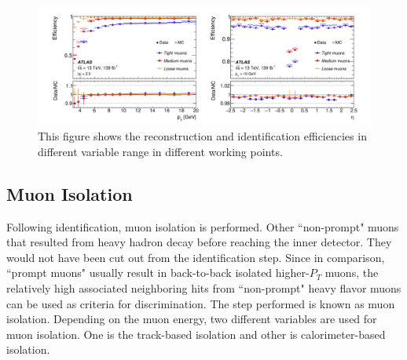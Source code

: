 \begin{figure}[!htb]
    \begin{center}
        \includegraphics[width=1\textwidth]{figures/common_ana/IdentificationEff}
        \caption{
            This figure shows the reconstruction and identification efficiencies in different variable range in different working points\cite{Aad:2746302}.
        }
        \label{fig:identificationWP}
    \end{center}
\end{figure}



\subsection{Muon Isolation}
Following identification, muon isolation is performed. Other ``non-prompt" muons that resulted from heavy hadron decay before reaching the inner detector. They would not have been cut out from the identification step. Since in comparison, ``prompt muons" usually result in back-to-back isolated higher-$P_{T}$ muons, the relatively high associated neighboring hits from ``non-prompt" heavy flavor muons can be used as criteria for discrimination. The step performed is known as muon isolation. Depending on the muon energy, two different variables are used for muon isolation. One is the track-based isolation and other is calorimeter-based isolation.

